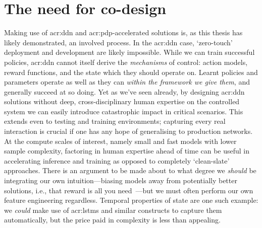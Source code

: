 \section{The need for co-design}
Making use of \gls{acr:ddn} and \gls{acr:pdp}-accelerated solutions is, as this thesis has likely demonstrated, an involved process.
In the \gls{acr:ddn} case, `zero-touch' deployment and development are likely impossible.
While we can train successful policies, \gls{acr:ddn} cannot itself derive the \emph{mechanisms} of control: action models, reward functions, and the state which they should operate on.
Learnt policies and parameters operate as well as they can \emph{within the framework we give them}, and generally succeed at so doing.
Yet as we've seen already, by designing \gls{acr:ddn} solutions without deep, cross-disciplinary human expertise on the controlled system we can easily introduce catastrophic impact in critical scenarios.
This extends even to testing and training environments; capturing every real interaction is crucial if one has any hope of generalising to production networks.
At the compute scales of interest, namely small and fast models with lower sample complexity, factoring in human expertise ahead of time can be useful in accelerating inference and training as opposed to completely `clean-slate' approaches.
There is an argument to be made about to what degree we \emph{should} be integrating our own intuition---biasing models away from potentially better solutions, i.e., that reward is all you need~\parencite{DBLP:journals/ai/SilverSPS21}---but we must often perform our own feature engineering regardless.
Temporal properties of state are one such example: we \emph{could} make use of \glspl{acr:lstm} and similar constructs to capture them automatically, but the price paid in complexity is less than appealing.
%
%

